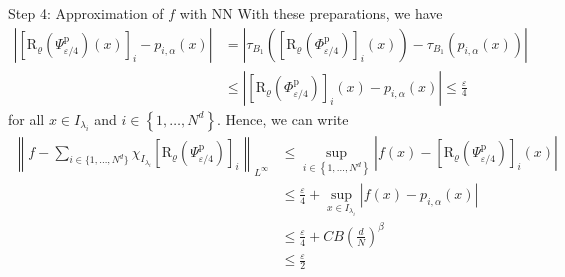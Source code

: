 \documentclass{if-beamer}
\newcommand{\norm}[2]{\left\lVert#1\right\rVert_{#2}}
\begin{document}
\begin{frame}{Step 4: Approximation of $f$ with NN}
    With these preparations, we have 
    \begin{align*}
        \left|\left[\mathrm{R}_{\varrho}\left(\Psi_{\varepsilon / 4}^{\mathrm{p}}\right)(x)\right]_{i}-p_{i, \alpha}(x)\right| &= \left|\tau_{B_{1}}\left(\left[\mathrm{R}_{\varrho}\left(\Phi_{\varepsilon / 4}^{\mathrm{p}}\right)\right]_i(x)\right)-\tau_{B_{1}}\left(p_{i, \alpha}(x)\right)\right|\\
        &\leq\left|\left[\mathrm{R}_{\varrho}\left(\Phi_{\varepsilon / 4}^{\mathrm{p}}\right)\right]_i(x)-p_{i, \alpha}(x)\right| \leq \frac{\varepsilon}{4}
    \end{align*}
    for all $x \in I_{\lambda_{i}}$ and $i \in\left\{1, \ldots, N^{d}\right\}$. Hence, we can write
    {\small
    \begin{align*}
        \norm{f-\sum_{i \in\{1, \ldots, N^{d}\}} \chi_{I_{\lambda_{i}}}\left[\mathrm{R}_{\varrho}\left(\Psi_{\varepsilon / 4}^{\mathrm{p}}\right)\right]_{i}}{L^{\infty}} & \leq \sup _{i \in\left\{1, \ldots, N^{d}\right\}}\left|f(x)-\left[\mathrm{R}_{\varrho}\left(\Psi_{\varepsilon / 4}^{\mathrm{p}}\right)\right]_{i}(x)\right| \\
        & \leq \frac{\varepsilon}{4}+\sup _{x \in I_{\lambda_{i}}}\left|f(x)-p_{i, \alpha}(x)\right|\\ 
        &\leq \frac{\varepsilon}{4}+C B\left(\frac{d}{N}\right)^{\beta} \\
        &\leq \frac{\varepsilon}{2}
    \end{align*}
    }%
\end{frame}
\end{document}
